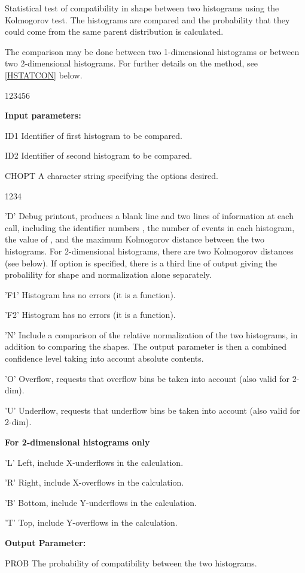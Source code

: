 \Action
Statistical test of compatibility in shape between
two histograms using the Kolmogorov test.
The histograms are compared and the probability that they
could come from the same parent distribution is calculated.
 
The comparison may be done between two 1-dimensional
histograms or between two 2-dimensional histograms.
For further details on the method, see \ref{HSTATCON}
below.
 
\begin{DLtt}{123456}
\item[{\rm\bf Input parameters:}]
\item[ID1] Identifier of first histogram to be compared.
\item[ID2] Identifier of second histogram to be compared.
\item[CHOPT] A character string specifying the options desired.
\begin{DLtt}{1234}
\item['D'] Debug printout, produces a blank line and two lines of
information at each call, including the identifier numbers ,
the number
of events in each histogram, the value of , and the maximum
Kolmogorov distance between the two histograms.
For 2-dimensional histograms,
there are two Kolmogorov distances (see below). If option  is
specified, there is a third line of output giving the probalility
for shape and normalization alone separately.
\item['F1'] Histogram  has no errors (it is a function).
\item['F2'] Histogram  has no errors (it is a function).
\item['N'] Include a comparison of the relative normalization
of the
two histograms, in addition to comparing the shapes.
The output parameter  is then
a combined confidence level taking into account absolute contents.
\item['O'] Overflow, requests that overflow bins be taken
into account (also valid for 2-dim).
\item['U'] Underflow, requests that underflow bins be taken
into account (also valid for 2-dim).
\item[{\rm\bf For 2-dimensional histograms only}]
\item['L'] Left, include X-underflows in the calculation.
\item['R'] Right, include X-overflows in the calculation.
\item['B'] Bottom, include Y-underflows in the calculation.
\item['T'] Top, include Y-overflows in the calculation.
\end{DLtt}
\item[{\rm\bf Output Parameter:}]
\item[PROB] The probability of compatibility between the two histograms.
\end{DLtt}

